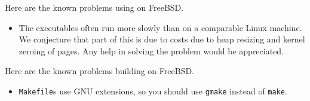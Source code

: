 
Here are the known problems using {\mlton} on FreeBSD.

\begin{itemize}

\item
The executables often run more slowly than on a comparable Linux
machine.  We conjecture that part of this is due to costs due to heap
resizing and kernel zeroing of pages.  Any help in solving the problem
would be appreciated.

\end{itemize}

Here are the known problems building {\mlton} on FreeBSD.

\begin{itemize}

\item {\mlton} {\tt Makefile}s use GNU extensions, so you should use {\tt gmake}
instead of {\tt make}.

\end{itemize}
